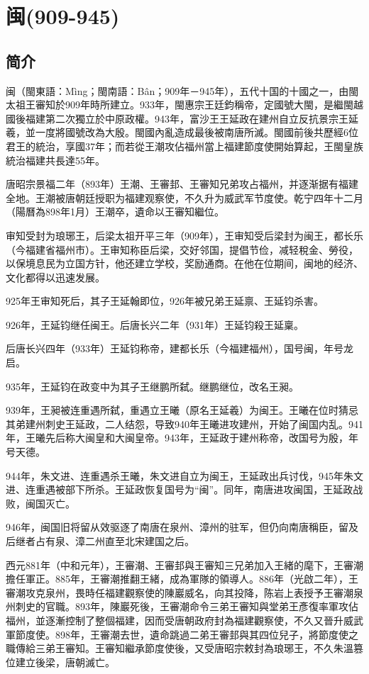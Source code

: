 

\section{闽\tiny(909-945)}

\subsection{简介}

闽（閩東語：Mìng；閩南語：Bân；909年－945年），五代十国的十國之一，由閩太祖王審知於909年時所建立。933年，閩惠宗王廷鈞稱帝，定國號大閩，是繼閩越國後福建第二次獨立於中原政權。943年，富沙王王延政在建州自立反抗景宗王延羲，並一度將國號改為大殷。閩國內亂造成最後被南唐所滅。閩國前後共歷經6位君王的統治，享國37年；而若從王潮攻佔福州當上福建節度使開始算起，王閩皇族統治福建共長達55年。

唐昭宗景福二年（893年）王潮、王審邽、王審知兄弟攻占福州，并逐渐据有福建全地。王潮被唐朝廷授职为福建观察使，不久升为威武军节度使。乾宁四年十二月（陽曆為898年1月）王潮卒，遺命以王審知繼位。

审知受封为琅琊王，后梁太祖开平三年（909年），王审知受后梁封为闽王，都长乐（今福建省福州市）。王审知称臣后梁，交好邻国，提倡节俭，减轻稅金、勞役，以保境息民为立国方针，他还建立学校，奖励通商。在他在位期间，闽地的经济、文化都得以迅速发展。

925年王审知死后，其子王延翰即位，926年被兄弟王延禀、王延钧杀害。

926年，王延钧继任闽王。后唐长兴二年（931年）王延钧殺王延稟。

后唐长兴四年（933年）王延钧称帝，建都长乐（今福建福州），国号闽，年号龙启。

935年，王延钧在政变中为其子王继鹏所弑。继鹏继位，改名王昶。

939年，王昶被连重遇所弑，重遇立王曦（原名王延羲）为闽王。王曦在位时猜忌其弟建州刺史王延政，二人结怨，导致940年王曦进攻建州，开始了闽国内乱。941年，王曦先后称大闽皇和大闽皇帝。943年，王延政于建州称帝，改国号为殷，年号天德。

944年，朱文进、连重遇杀王曦，朱文进自立为闽王，王延政出兵讨伐，945年朱文进、连重遇被部下所杀。王延政恢复国号为“闽”。同年，南唐进攻闽国，王延政战败，闽国灭亡。

946年，闽国旧将留从效驱逐了南唐在泉州、漳州的驻军，但仍向南唐稱臣，留及后继者占有泉、漳二州直至北宋建国之后。

西元881年（中和元年），王審潮、王審邽與王審知三兄弟加入王緒的麾下，王審潮擔任軍正。885年，王審潮推翻王緒，成為軍隊的領導人。886年（光啟二年），王審潮攻克泉州，畏時任福建觀察使的陳巖威名，向其投降，陈岩上表授予王審潮泉州刺史的官職。893年，陳巖死後，王審潮命令三弟王審知與堂弟王彥復率軍攻佔福州，並逐漸控制了整個福建，因而受唐朝政府封為福建觀察使，不久又晉升威武軍節度使。898年，王審潮去世，遺命跳過二弟王審邽與其四位兒子，將節度使之職傳給三弟王審知。王審知繼承節度使後，又受唐昭宗敕封為琅琊王，不久朱溫篡位建立後梁，唐朝滅亡。

